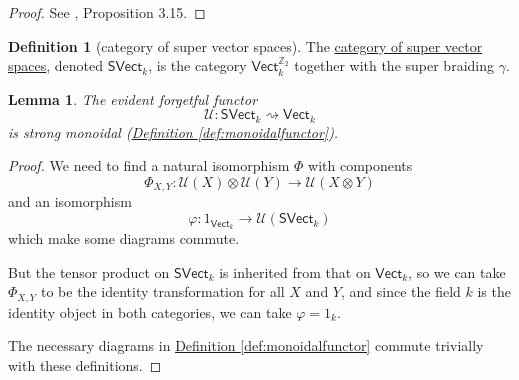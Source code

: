 \documentclass[a4paper,10pt]{scrreprt}
\newcommand{\Z}{\mathbb{Z}}
\newcommand{\defn}[1]{\ul{#1}}
\theoremstyle{definition}
\newtheorem{definition}{Definition}[section]
\theoremstyle{plain}
\newtheorem{lemma}{Lemma}[section]
\theoremstyle{remark}
\begin{document}
\begin{proof}
  See \cite{nlab-deligne-theorem}, Proposition 3.15.
\end{proof}

\begin{definition}[category of super vector spaces]
  \label{def:categoryofsupervectorspaces}
  The \defn{category of super vector spaces}, denoted $\mathsf{SVect}_{k}$, is the category $\mathsf{Vect}_{k}^{\Z_{2}}$ together with the super braiding $\gamma$.
\end{definition}

\begin{lemma}
  The evident forgetful functor 
  \begin{equation*}
    \mathcal{U}\colon \mathsf{SVect}_{k} \rightsquigarrow \mathsf{Vect}_{k}
  \end{equation*}
  is strong monoidal (\hyperref[def:monoidalfunctor]{Definition \ref*{def:monoidalfunctor}}).
\end{lemma}
\begin{proof}
  We need to find a natural isomorphism $\Phi$ with components 
  \begin{equation*}
    \Phi_{X, Y}\colon \mathcal{U}(X) \otimes \mathcal{U}(Y) \to \mathcal{U}(X \otimes Y)
  \end{equation*}
  and an isomorphism
  \begin{equation*}
    \varphi\colon 1_{\mathsf{Vect}_{k}} \to \mathcal{U}(\mathsf{SVect}_{k})
  \end{equation*}
  which make some diagrams commute.

  But the tensor product on $\mathsf{SVect}_{k}$ is inherited from that on $\mathsf{Vect}_{k}$, so we can take $\Phi_{X, Y}$ to be the identity transformation for all $X$ and $Y$, and since the field $k$ is the identity object in both categories, we can take $\varphi = 1_{k}$.

  The necessary diagrams in \hyperref[def:monoidalfunctor]{Definition \ref*{def:monoidalfunctor}} commute trivially with these definitions.
\end{proof} 
\end{document}
